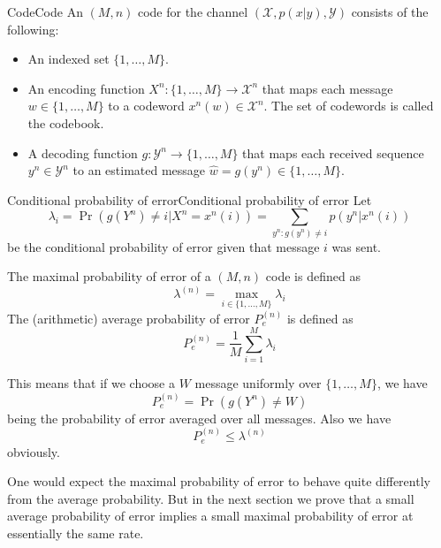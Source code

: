 \documentclass[../main.tex]{subfiles}
\begin{document}
\begin{definition}{Code}{Code}
	An $(M,n)$ code for the channel $(\mathcal{X}, p(x|y), \mathcal{Y})$ consists of the following:
	\begin{itemize}
		\item An indexed set $\{1, \ldots ,M\}$.
		\item An encoding function $X^n: \{1, \ldots ,M\} \to \mathcal{X}^n$ that maps each message $w \in \{1, \ldots ,M\}$ to a codeword $x^n(w) \in \mathcal{X}^n$. The set of codewords is called the codebook.
		\item A decoding function $g: \mathcal{Y}^n \to \{1, \ldots ,M\}$ that maps each received sequence $y^n \in \mathcal{Y}^n$ to an estimated message $\hat{w} = g(y^n) \in \{1, \ldots ,M\}$.
	\end{itemize}
\end{definition}

\begin{definition}{Conditional probability of error}{Conditional probability of error}
	Let
	\begin{equation}
		\lambda_i = \Pr(g(Y^n) \neq i | X^n = x^n(i)) = \sum_{y^n: g(y^n) \neq i} p(y^n|x^n(i))
	\end{equation}
	be the conditional probability of error given that message $i$ was sent.

	The maximal probability of error of a $(M,n)$ code is defined as
	\begin{equation}
		\lambda^{(n)} = \max_{i \in \{1, \ldots ,M\}} \lambda_i
	\end{equation}
	The (arithmetic) average probability of error $P_e^{(n)}$ is defined as
	\begin{equation}
		P_e^{(n)} = \frac{1}{M} \sum_{i=1}^M \lambda_i
	\end{equation}
\end{definition}
This means that if we choose a $W$ message uniformly over $\{1, \ldots ,M\}$, we have
\begin{equation}
	P_e^{(n)} = \Pr(g(Y^n) \neq W)
\end{equation}
being the probability of error averaged over all messages. Also we have
\begin{equation}
	P_e^{(n)} \leq \lambda^{(n)}
\end{equation}
obviously.

\begin{remark}
	One would expect the maximal probability of error to behave quite differently from the average probability. But in the next section we prove that a small average probability of error implies a small maximal probability of error at essentially the same rate.
\end{remark}
\end{document}
